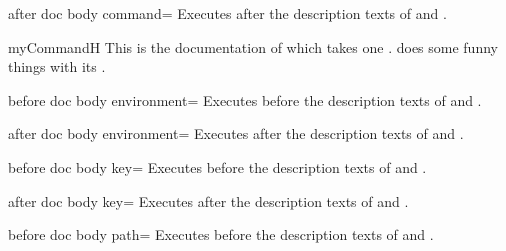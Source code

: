 \begin{docTcbKey}[][doc new=2015-10-09]{after doc body command}{=}{\tcbdocdescInitEmpty}
  Executes  after the description texts
  of  and .
\begin{dispExample}

\begin{docCommand*}{myCommandH}{}
  This is the documentation of  which takes one .
   does some funny things with its .
\end{docCommand*}
\end{dispExample}
\end{docTcbKey}


\begin{docTcbKey}[][doc new=2015-10-09]{before doc body environment}{=}{\tcbdocdescInitEmpty}
  Executes  before the description texts
  of  and .
\end{docTcbKey}

\begin{docTcbKey}[][doc new=2015-10-09]{after doc body environment}{=}{\tcbdocdescInitEmpty}
  Executes  after the description texts
  of  and .
\end{docTcbKey}


\begin{docTcbKey}[][doc new=2015-10-09]{before doc body key}{=}{\tcbdocdescInitEmpty}
  Executes  before the description texts
  of  and .
\end{docTcbKey}

\begin{docTcbKey}[][doc new=2015-10-09]{after doc body key}{=}{\tcbdocdescInitEmpty}
  Executes  after the description texts
  of  and .
\end{docTcbKey}

\clearpage

\begin{docTcbKey}[][doc new=2019-09-18]{before doc body path}{=}{\tcbdocdescInitEmpty}
  Executes  before the description texts
  of  and .
\end{docTcbKey}

